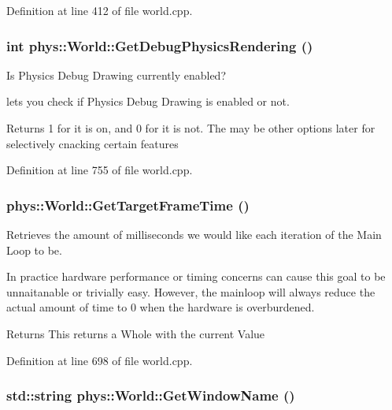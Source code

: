 Definition at line 412 of file world.cpp.

\hypertarget{classphys_1_1World_a92070d16eb81866b4393f0ed96fbcbbc}{
\subsubsection[{GetDebugPhysicsRendering}]{\setlength{\rightskip}{0pt plus 5cm}int phys::World::GetDebugPhysicsRendering ()}}
\label{da/ddf/classphys_1_1World_a92070d16eb81866b4393f0ed96fbcbbc}


Is Physics Debug Drawing currently enabled? 

lets you check if Physics Debug Drawing is enabled or not. \begin{DoxyReturn}{Returns}
1 for it is on, and 0 for it is not. The may be other options later for selectively cnacking certain features 
\end{DoxyReturn}


Definition at line 755 of file world.cpp.

\hypertarget{classphys_1_1World_aa063ace52be484c7b03ec5859453f48b}{
\subsubsection[{GetTargetFrameTime}]{ phys::World::GetTargetFrameTime ()}}
\label{da/ddf/classphys_1_1World_aa063ace52be484c7b03ec5859453f48b}


Retrieves the amount of milliseconds we would like each iteration of the Main Loop to be. 

In practice hardware performance or timing concerns can cause this goal to be unnaitanable or trivially easy. However, the mainloop will always reduce the actual amount of time to 0 when the hardware is overburdened. \begin{DoxyReturn}{Returns}
This returns a Whole with the current Value 
\end{DoxyReturn}


Definition at line 698 of file world.cpp.

\hypertarget{classphys_1_1World_a1f0139bbc9561bcf18844be25e4adc73}{
\subsubsection[{GetWindowName}]{\setlength{\rightskip}{0pt plus 5cm}std::string phys::World::GetWindowName ()}}
\label{da/ddf/classphys_1_1World_a1f0139bbc9561bcf18844be25e4adc73}


